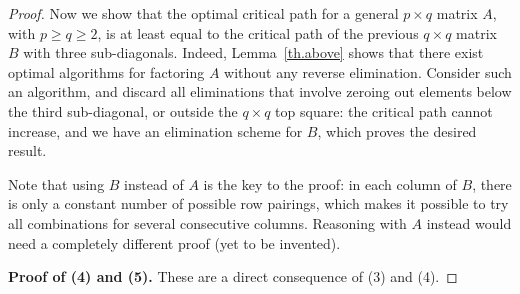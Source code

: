 \documentclass[a4paper,twopages]{article}
\begin{document}
\begin{proof}
    Now we show that the optimal critical path for a general $p \times q$
    matrix $A$, with $p \geq q \geq 2$, is at least equal to the critical path
    of the previous $q \times q$ matrix $B$ with three sub-diagonals. Indeed,
    Lemma~\ref{th.above} shows that there exist optimal algorithms for
    factoring $A$ without any reverse elimination. Consider such an algorithm,
    and discard all eliminations that involve zeroing out elements below the
    third sub-diagonal, or outside the $q \times q$ top square: the critical
    path cannot increase, and we have an elimination scheme for $B$, which
    proves the desired result.

    Note that using $B$ instead of $A$ is the key to the proof: in each column of
    $B$, there is only a constant number of possible row pairings, which makes it possible to
    try all combinations for several consecutive columns. Reasoning with $A$ instead would
    need a completely different proof (yet to be invented).

\textbf{Proof of (4) and (5).}
    These are a direct consequence of (3) and (4).
\end{proof}
\end{document}
